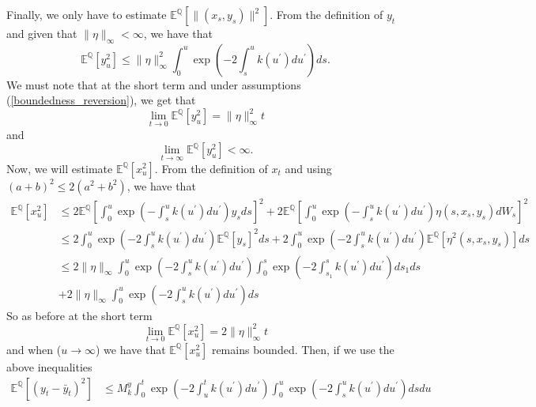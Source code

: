 \documentclass[a4paper,10pt]{article}
\newcommand{\1}{\mathbf{1}}
\begin{document}
Finally, we only have to estimate $\mathbb{E}^{\mathbb{Q}}\left[ \|(x_s, y_s)\|^{2}\right]$. From the definition of $y_t$ and given that $\|\eta\|_{\infty} < \infty$, we have that
\begin{equation*}
\mathbb{E}^{\mathbb{Q}}[y^{2}_u] \leq \|\eta\|^{2}_{\infty} \int_{0}^{u} \exp\left(- 2\int_{s}^{u} k(u^{\prime}) du^{\prime}\right) ds.
\end{equation*}
We must note that at the short term and under assumptions (\ref{boundedness_reversion}), we get that
\begin{equation*}
\lim_{t \to 0} \mathbb{E}^{\mathbb{Q}}[y^{2}_u] = \|\eta\|^{2}_{\infty} t
\end{equation*}
and 
\begin{equation*}
\lim_{t \to \infty} \mathbb{E}^{\mathbb{Q}}[y^{2}_u] < \infty.
\end{equation*}
Now, we will estimate $\mathbb{E}^{\mathbb{Q}}[x^{2}_u]$. From the definition of $x_t$ and using $(a+b)^2 \leq 2(a^{2}+ b^{2})$, we have that
\begin{align*}
\mathbb{E}^{\mathbb{Q}}[x^{2}_u] &\leq 2 \mathbb{E}^{\mathbb{Q}}\left[\int_{0}^{u} \exp\left(- \int_{s}^{u} k(u^{\prime}) du^{\prime}\right) y_s  ds \right]^{2} +  2 \mathbb{E}^{\mathbb{Q}}\left[\int_{0}^{u} \exp\left(- \int_{s}^{u} k(u^{\prime}) du^{\prime}\right) \eta(s,x_s,y_s)  dW_s \right]^{2} \nonumber \\
&\leq 2 \int_{0}^{u} \exp\left(- 2\int_{s}^{u} k(u^{\prime}) du^{\prime}\right) \mathbb{E}^{\mathbb{Q}}\left[y_s\right]^{2} ds + 2 \int_{0}^{u} \exp\left(- 2 \int_{s}^{u} k(u^{\prime}) du^{\prime}\right) \mathbb{E}^{\mathbb{Q}}\left[\eta^{2}(s,x_s,y_s)\right] ds \\
&\leq 2 \|\eta\|_{\infty} \int_{0}^{u} \exp\left(- 2\int_{s}^{u} k(u^{\prime}) du^{\prime}\right) \int_{0}^{s}  \exp\left(- 2\int_{s_1}^{s} k(u^{\prime}) du^{\prime}\right) ds_1 ds\\
&+  2 \|\eta\|_{\infty} \int_{0}^{u} \exp\left(- 2\int_{s}^{u} k(u^{\prime}) du^{\prime}\right) ds
\end{align*}
So as before at the short term
$$
\lim_{t \to 0} \mathbb{E}^{\mathbb{Q}}[x^{2}_u] = 2\|\eta\|^{2}_{\infty} t
$$
and when ($u \to \infty$) we have that $\mathbb{E}^{\mathbb{Q}}[x^{2}_u]$ remains bounded. Then, if we use the above inequalities 
\begin{align*}
\mathbb{E}^{\mathbb{Q}}[(y_t - \bar{y}_t)^{2}] &\leq M^{y}_k \int_{0}^{t}  \exp\left(- 2\int_{u}^{t} k(u^{\prime}) du^{\prime}\right)  \int_{0}^{u} \exp\left(- 2\int_{s}^{u} k(u^{\prime}) du^{\prime}\right) ds du
\end{align*}
\end{document}
